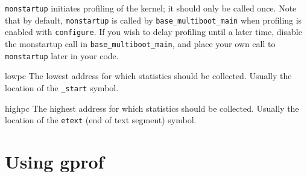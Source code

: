 \begin{apidesc}
	{\tt monstartup} initiates profiling of the kernel; it should only
	be called once.  Note that by default, {\tt monstartup} is 
	called by {\tt base_multiboot_main} when profiling is enabled
	with {\tt configure}.  If you wish to delay profiling until
	a later time, disable the monstartup call in
	{\tt base_multiboot_main}, and place your own call to
	{\tt monstartup} later in your code.
\end{apidesc}
\begin{apiparm}
	\item[lowpc] The lowest address for which statistics should be
		     collected.  Usually the location of the {\tt _start}
		     symbol.
	\item[highpc] The highest address for which statistics
		     should be collected.  Usually the location of
		     the {\tt etext} (end of text segment) symbol.
\end{apiparm}

\section{Using gprof}
\label{using-gprof}

